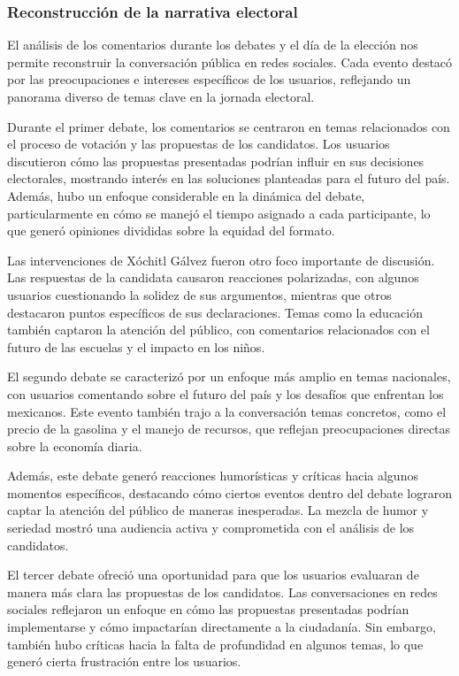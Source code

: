 \documentclass[10pt, a4paper]{article}
\begin{document}
	\subsubsection{Reconstrucción de la narrativa electoral}
	
	El análisis de los comentarios durante los debates y el día de la elección nos permite reconstruir la conversación pública en redes sociales. Cada evento destacó por las preocupaciones e intereses específicos de los usuarios, reflejando un panorama diverso de temas clave en la jornada electoral.

	Durante el primer debate, los comentarios se centraron en temas relacionados con el proceso de votación y las propuestas de los candidatos. Los usuarios discutieron cómo las propuestas presentadas podrían influir en sus decisiones electorales, mostrando interés en las soluciones planteadas para el futuro del país. Además, hubo un enfoque considerable en la dinámica del debate, particularmente en cómo se manejó el tiempo asignado a cada participante, lo que generó opiniones divididas sobre la equidad del formato.
	
	Las intervenciones de Xóchitl Gálvez fueron otro foco importante de discusión. Las respuestas de la candidata causaron reacciones polarizadas, con algunos usuarios cuestionando la solidez de sus argumentos, mientras que otros destacaron puntos específicos de sus declaraciones. Temas como la educación también captaron la atención del público, con comentarios relacionados con el futuro de las escuelas y el impacto en los niños.
	
	El segundo debate se caracterizó por un enfoque más amplio en temas nacionales, con usuarios comentando sobre el futuro del país y los desafíos que enfrentan los mexicanos. Este evento también trajo a la conversación temas concretos, como el precio de la gasolina y el manejo de recursos, que reflejan preocupaciones directas sobre la economía diaria.
	
	Además, este debate generó reacciones humorísticas y críticas hacia algunos momentos específicos, destacando cómo ciertos eventos dentro del debate lograron captar la atención del público de maneras inesperadas. La mezcla de humor y seriedad mostró una audiencia activa y comprometida con el análisis de los candidatos.

	El tercer debate ofreció una oportunidad para que los usuarios evaluaran de manera más clara las propuestas de los candidatos. Las conversaciones en redes sociales reflejaron un enfoque en cómo las propuestas presentadas podrían implementarse y cómo impactarían directamente a la ciudadanía. Sin embargo, también hubo críticas hacia la falta de profundidad en algunos temas, lo que generó cierta frustración entre los usuarios.
	
\end{document}
